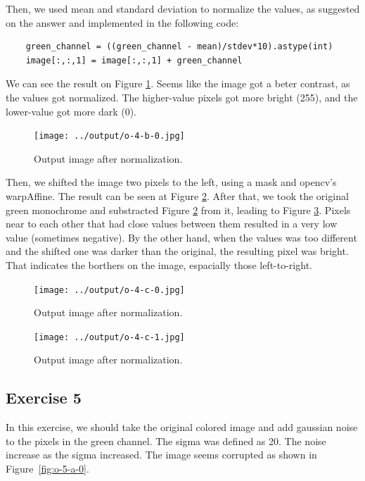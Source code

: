 \documentclass[]{IEEEtran}
\begin{document}
  Then, we used mean and standard deviation to normalize the values, as suggested on the answer and implemented in the following code:
  \begin{lstlisting}     
    green_channel = ((green_channel - mean)/stdev*10).astype(int)
    image[:,:,1] = image[:,:,1] + green_channel    
  \end{lstlisting}  
  We can see the result on Figure \ref{fig:o-4-b-0}. Seems like the image got a beter contrast, as the values got normalized. The higher-value pixels got more bright (255), and the lower-value got more dark (0).
  \begin{figure}[!h]
    \centering
    \texttt{[image: ../output/o-4-b-0.jpg]}
    \caption{Output image after normalization.}
    \label{fig:o-4-b-0}
  \end{figure}

  Then, we shifted the image two pixels to the left, using a mask and opencv's warpAffine. The result can be seen at Figure \ref{fig:0-4-c-0}. After that, we took the original green monochrome and substracted Figure \ref{fig:0-4-c-0} from it, leading to Figure \ref{fig:0-4-c-1}. Pixels near to each other that had close values between them resulted in a very low value (sometimes negative). By the other hand, when the values was too different and the shifted one was darker than the original, the resulting pixel was bright. That indicates the borthers on the image, espacially those left-to-right. 

  \begin{figure}[!h]
    \centering
    \texttt{[image: ../output/o-4-c-0.jpg]}
    \caption{Output image after normalization.}
    \label{fig:0-4-c-0}
  \end{figure}

  \begin{figure}[!h]
    \centering
    \texttt{[image: ../output/o-4-c-1.jpg]}
    \caption{Output image after normalization.}
    \label{fig:0-4-c-1}
  \end{figure}


  \subsection{Exercise 5}
  
  In this exercise, we should take the original colored image and add gaussian noise to the pixels in the green channel. The sigma was defined as 20. The noise increase as the sigma increased. The image seems corrupted as shown in Figure~\ref{fig:o-5-a-0}.
  
\end{document}
